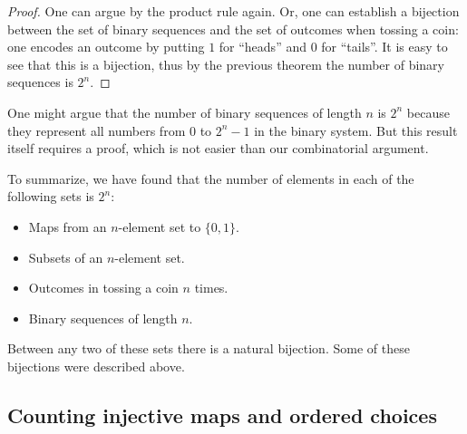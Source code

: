 \begin{page}
\setcounter{section}{2}
\setcounter{subsection}{2}
\setcounter{dfn}{6}
\label{portion:48}

\begin{proof}
One can argue by the product rule again.
Or, one can establish a bijection between the set of binary sequences and the set of outcomes when tossing a coin:
one encodes an outcome by putting $1$ for ``heads'' and $0$ for ``tails''.
It is easy to see that this is a bijection, thus by the previous theorem the number of binary sequences is $2^n$.
\end{proof}


\end{page}

\begin{page}
\setcounter{section}{2}
\setcounter{subsection}{2}
\setcounter{dfn}{7}
\label{portion:50}

\begin{rem}
One might argue that the number of binary sequences of length $n$ is $2^n$ because they represent all numbers from $0$ to $2^n - 1$ in the binary system.
But this result itself requires a proof, which is not easier than our combinatorial argument.
\end{rem}

\end{page}

\begin{page}
\setcounter{section}{2}
\setcounter{subsection}{3}
\setcounter{dfn}{7}
\label{portion:51}


To summarize, we have found that the number of elements in each of the following sets is $2^n$:
\begin{itemize}
\item
Maps from an $n$-element set to $\{0,1\}$.
\item
Subsets of an $n$-element set.
\item
Outcomes in tossing a coin $n$ times.
\item
Binary sequences of length $n$.
\end{itemize}

Between any two of these sets there is a natural bijection.
Some of these bijections were described above.



\end{page}

\begin{page}
\setcounter{section}{2}
\setcounter{subsection}{3}
\setcounter{dfn}{7}
\label{portion:53}

\subsection{Counting injective maps and ordered choices}

\end{page}

